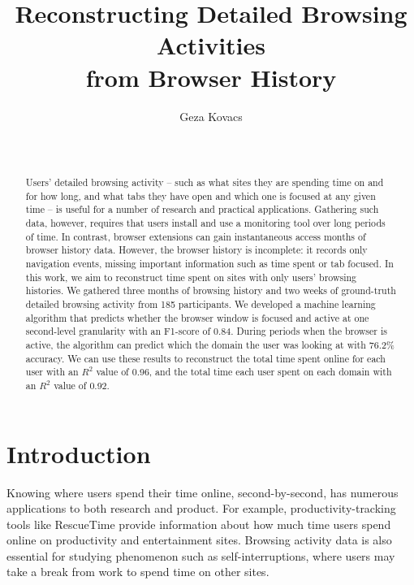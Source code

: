 \documentclass{sigchi}
\begin{document}
\title{Reconstructing Detailed Browsing Activities\\from Browser History}

\author{
  \alignauthor Geza Kovacs\\
    \\
    \\
}

\maketitle

\begin{abstract}
Users' detailed browsing activity -- such as what sites they are spending time on and for how long, and what tabs they have open and which one is focused at any given time -- is useful for a number of research and practical applications. Gathering such data, however, requires that users install and use a monitoring tool over long periods of time. In contrast, browser extensions can gain instantaneous access months of browser history data. However, the browser history is incomplete: it records only navigation events, missing important information such as time spent or tab focused. In this work, we aim to reconstruct time spent on sites with only users' browsing histories. We gathered three months of browsing history and two weeks of ground-truth detailed browsing activity from 185 participants. We developed a machine learning algorithm that predicts whether the browser window is focused and active at one second-level granularity with an F1-score of 0.84. During periods when the browser is active, the algorithm can predict which the domain the user was looking at with 76.2\% accuracy. We can use these results to reconstruct the total time spent online for each user with an $R^2$ value of 0.96, and the total time each user spent on each domain with an $R^2$ value of 0.92.
\end{abstract}



\section{Introduction}

Knowing where users spend their time online, second-by-second, has numerous applications to both research and product. For example, productivity-tracking tools like RescueTime provide information about how much time users spend online on productivity and entertainment sites. Browsing activity data is also essential for studying phenomenon such as self-interruptions, where users may take a break from work to spend time on other sites.
\end{document}
